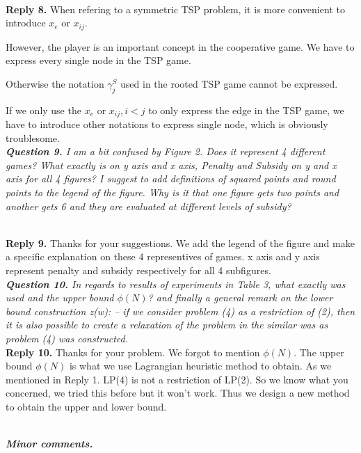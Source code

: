 \documentclass[11pt]{article}
\begin{document}
\\[2mm]
\noindent \textbf{Reply 8.}
When refering to a symmetric TSP problem, it is more convenient to introduce $x_e$ or $x_{ij}$.

However, the player is an important concept in the cooperative game.
We have to express every single node in the TSP game.

Otherwise the notation $\gamma^{S}_j$ used in the rooted TSP game cannot be expressed.

If we only use the $x_e$ or $x_{ij}, i<j$ to only express the edge in the TSP game, we have to introduce other notations to express single node, which is obviously troublesome.
\\[4mm]


\noindent \textit{\textbf{Question 9.}
I am a bit confused by Figure 2. Does it represent 4 different games? What exactly is on y axis and x axis, Penalty and Subsidy on y and x axis for all 4 figures? I suggest to add definitions of squared points and round points to the legend of the figure. Why is it that one figure gets two points and another gets 6 and they are evaluated at different levels of subsidy?}

\\[2mm]
\noindent \textbf{Reply 9.}
Thanks for your suggestions.
We add the legend of the figure and make a specific explanation on these 4 representives of games.
x axis and y axis represent penalty and subsidy respectively for all 4 subfigures.
\\[4mm]


\noindent \textit{\textbf{Question 10.}
In regards to results of experiments in Table 3, what exactly was used and the upper bound $\phi(N)$? and finally a general remark on the lower bound construction z(w):
-- if we consider problem (4) as a restriction of (2), then it is also possible to create a relaxation of the problem in the similar was as problem (4) was constructed.}
\\[2mm]
\noindent \textbf{Reply 10.}
Thanks for your problem. We forgot to mention $\phi(N)$.
The upper bound $\phi(N)$ is what we use Lagrangian heuristic method to obtain.
As we mentioned in Reply 1. LP(4) is not a restriction of LP(2). So we know what you concerned, we tried this before but it won't work. Thus we design a new method to obtain the upper and lower bound.

\\[4mm]


\noindent \textit{\textbf{Minor comments.}}
\end{document}
